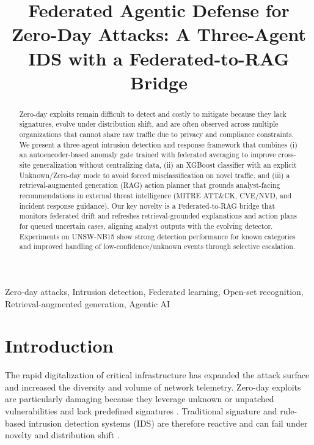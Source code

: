 \documentclass[conference]{IEEEtran}
\begin{document}
\title{Federated Agentic Defense for Zero-Day Attacks: A Three-Agent IDS with a Federated-to-RAG Bridge}

\author{
}

\maketitle

\begin{abstract}
Zero-day exploits remain difficult to detect and costly to mitigate because they lack signatures, evolve under distribution shift, and are often observed across multiple organizations that cannot share raw traffic due to privacy and compliance constraints. We present a three-agent intrusion detection and response framework that combines (i) an autoencoder-based anomaly gate trained with federated averaging to improve cross-site generalization without centralizing data, (ii) an XGBoost classifier with an explicit Unknown/Zero-day mode to avoid forced misclassification on novel traffic, and (iii) a retrieval-augmented generation (RAG) action planner that grounds analyst-facing recommendations in external threat intelligence (MITRE ATT\&CK, CVE/NVD, and incident response guidance). Our key novelty is a Federated-to-RAG bridge that monitors federated drift and refreshes retrieval-grounded explanations and action plans for queued uncertain cases, aligning analyst outputs with the evolving detector. Experiments on UNSW-NB15 show strong detection performance for known categories and improved handling of low-confidence/unknown events through selective escalation.
\end{abstract}

\begin{IEEEkeywords}
Zero-day attacks, Intrusion detection, Federated learning, Open-set recognition, Retrieval-augmented generation, Agentic AI
\end{IEEEkeywords}

\section{Introduction}
The rapid digitalization of critical infrastructure has expanded the attack surface and increased the diversity and volume of network telemetry. Zero-day exploits are particularly damaging because they leverage unknown or unpatched vulnerabilities and lack predefined signatures \cite{Kaspersky,Y.Guo}. Traditional signature and rule-based intrusion detection systems (IDS) are therefore reactive and can fail under novelty and distribution shift \cite{A.Singh}.
\end{document}
